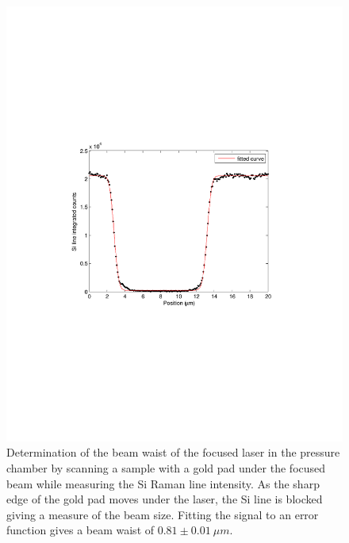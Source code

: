 \begin{figure}
	\begin{center}
	\includegraphics[scale=1]{Figs_Friction/SpotSize.pdf}
	\end{center}
	\caption[Beam waist determination]{\label{fig:fri:waist}
	Determination of the beam waist of the focused laser in the pressure chamber by scanning a sample with a gold pad under the focused beam while measuring the Si Raman line intensity.
	As the sharp edge of the gold pad moves under the laser, the Si line is blocked giving a measure of the beam size.
	Fitting the signal to an error function gives a beam waist of $0.81 \pm 0.01 \ \mu m$.}
\end{figure}

